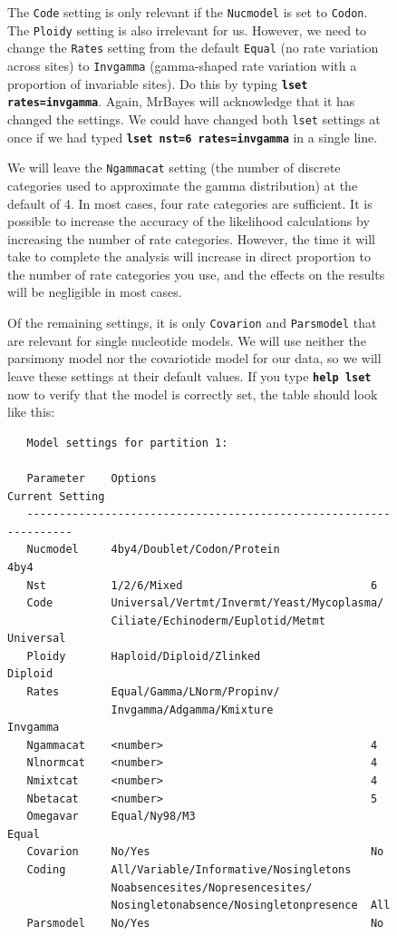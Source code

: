 \documentclass[12pt]{book}
\newcommand{\ttt}[1]{\texttt{#1}}
\newcommand{\tb}[1]{\ttt{\textbf{#1}}}
\begin{document}
\begin{figure}[h]
The \ttt{Code} setting is only relevant if the \ttt{Nucmodel} is set to \ttt{Codon}. The
\ttt{Ploidy} setting is also irrelevant for us. However, we need to change the \ttt{Rates} setting
from the default \ttt{Equal} (no rate variation across sites) to \ttt{Invgamma} (gamma-shaped rate
variation with a proportion of invariable sites). Do this by typing \tb{lset rates=invgamma}.
Again, MrBayes will acknowledge that it has changed the settings. We could have changed both
\ttt{lset} settings at once if we had typed \tb{lset nst=6 rates=invgamma} in a single line.

We will leave the \ttt{Ngammacat} setting (the number of discrete categories used to approximate
the gamma distribution) at the default of 4. In most cases, four rate categories are sufficient. It
is possible to increase the accuracy of the likelihood calculations by increasing the number of
rate categories. However, the time it will take to complete the analysis will increase in direct
proportion to the number of rate categories you use, and the effects on the results will be
negligible in most cases.

Of the remaining settings, it is only \ttt{Covarion} and \ttt{Parsmodel} that are relevant for
single nucleotide models. We will use neither the parsimony model nor the covariotide model for our
data, so we will leave these settings at their default values. If you type \tb{help lset} now to
verify that the model is correctly set, the table should look like this:

\begin{singlespacing}
\footnotesize
\begin{verbatim}
   Model settings for partition 1:

   Parameter    Options                               Current Setting
   ------------------------------------------------------------------
   Nucmodel     4by4/Doublet/Codon/Protein              4by4
   Nst          1/2/6/Mixed                             6
   Code         Universal/Vertmt/Invermt/Yeast/Mycoplasma/
                Ciliate/Echinoderm/Euplotid/Metmt       Universal
   Ploidy       Haploid/Diploid/Zlinked                 Diploid
   Rates        Equal/Gamma/LNorm/Propinv/
                Invgamma/Adgamma/Kmixture               Invgamma
   Ngammacat    <number>                                4
   Nlnormcat    <number>                                4
   Nmixtcat     <number>                                4
   Nbetacat     <number>                                5
   Omegavar     Equal/Ny98/M3                           Equal
   Covarion     No/Yes                                  No
   Coding       All/Variable/Informative/Nosingletons
                Noabsencesites/Nopresencesites/
                Nosingletonabsence/Nosingletonpresence  All
   Parsmodel    No/Yes                                  No


\end{verbatim}
\end{singlespacing}
\end{figure}
\end{document}
